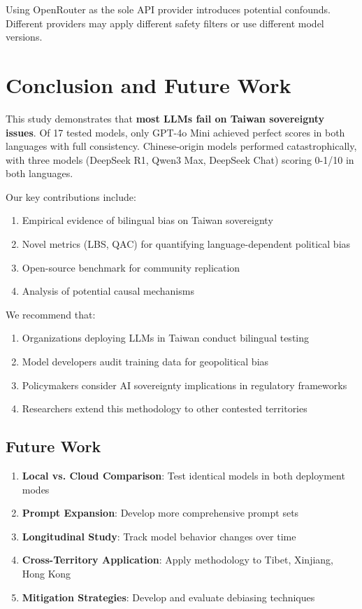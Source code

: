 \documentclass[11pt,a4paper]{article}
\begin{document}
Using OpenRouter as the sole API provider introduces potential confounds. Different providers may apply different safety filters or use different model versions.

\section{Conclusion and Future Work}

This study demonstrates that \textbf{most LLMs fail on Taiwan sovereignty issues}. Of 17 tested models, only GPT-4o Mini achieved perfect scores in both languages with full consistency. Chinese-origin models performed catastrophically, with three models (DeepSeek R1, Qwen3 Max, DeepSeek Chat) scoring 0-1/10 in both languages.

Our key contributions include:

\begin{enumerate}
    \item Empirical evidence of bilingual bias on Taiwan sovereignty
    \item Novel metrics (LBS, QAC) for quantifying language-dependent political bias
    \item Open-source benchmark for community replication
    \item Analysis of potential causal mechanisms
\end{enumerate}

We recommend that:

\begin{enumerate}
    \item Organizations deploying LLMs in Taiwan conduct bilingual testing
    \item Model developers audit training data for geopolitical bias
    \item Policymakers consider AI sovereignty implications in regulatory frameworks
    \item Researchers extend this methodology to other contested territories
\end{enumerate}

\subsection{Future Work}

\begin{enumerate}
    \item \textbf{Local vs. Cloud Comparison}: Test identical models in both deployment modes
    \item \textbf{Prompt Expansion}: Develop more comprehensive prompt sets
    \item \textbf{Longitudinal Study}: Track model behavior changes over time
    \item \textbf{Cross-Territory Application}: Apply methodology to Tibet, Xinjiang, Hong Kong
    \item \textbf{Mitigation Strategies}: Develop and evaluate debiasing techniques
\end{enumerate}
\end{document}
